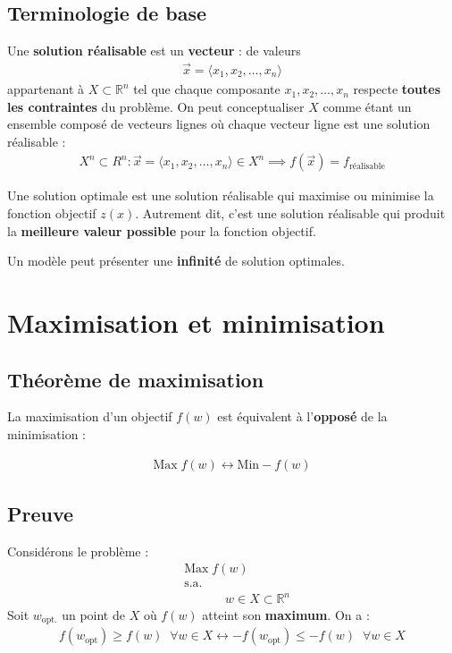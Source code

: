 \documentclass{report}
\begin{document}
\begin{multicols*}{2}
\section{Terminologie de base}
 Une \textbf{solution réalisable} est un \textbf{vecteur} :
 de valeurs  
    \begin{align*}
        \vec{x} = \langle x_1, x_2, \dots, x_n\rangle
    \end{align*}
 appartenant à $X \subset \mathbb{R}^n$ tel 
 que chaque composante $x_1, x_2, \dots, x_n$ respecte \textbf{toutes les contraintes} du problème.
 On peut conceptualiser 
 $X$ comme étant un ensemble composé de vecteurs lignes où  chaque vecteur ligne 
 est une solution réalisable :
 \begin{align*}
     X^n \subset R^n : \vec{x} = \langle x_1, x_2, \dots, x_n \rangle  \in X^n \implies 
     f(\vec{x}) = f_{\text{réalisable}}
 \end{align*}


Une \textcolor{myb}{solution optimale} est une solution réalisable qui maximise ou minimise 
la fonction objectif $z(x)$. Autrement dit, c'est une solution réalisable qui produit la 
\textbf{meilleure valeur possible} pour la fonction objectif.

\begin{note}{}{}
    Un modèle peut présenter une \textbf{infinité} de 
    solution optimales. 
\end{note} 

\chapter{Maximisation et minimisation}


\section{Théorème de maximisation}
    La maximisation d'un objectif $f(w)$ est équivalent à l'\textbf{opposé}
    de la minimisation :

    \begin{align*}
        \text{Max} \; f(w) \leftrightarrow  \text{Min} -f(w)
    \end{align*}

    \section{Preuve}
    Considérons le problème :
    \begin{align*}
        &\text{Max} \; f(w) \\ 
        &\text{s.a.} \\
        & \quad\quad\quad\; w \in X \subset \mathbb{R}^n
    \end{align*}
    Soit $w_{\text{opt.}}$ un point de $X$ où $f(w)$ atteint son  
    \textbf{\textcolor{myb}{maximum}}. On a :  
    \begin{align*}
        f\left(w_{\text{opt}} \right) \geq f(w) \;\; \forall w \in X 
        \leftrightarrow       
        - f\left(w_{\text{opt}} \right) \leq - f(w) \;\; \forall w \in X 
    \end{align*}


\end{multicols*}
\end{document}
